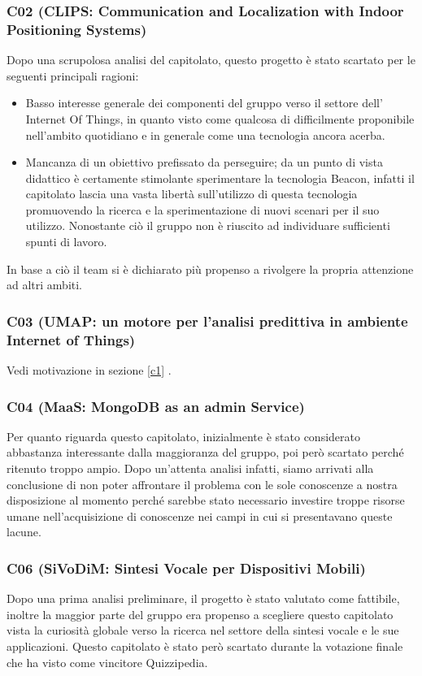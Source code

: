 \documentclass[a4paper,11pt]{article}
\begin{document}
\subsubsection{C02 (CLIPS: Communication and Localization with Indoor Positioning Systems)}
Dopo una scrupolosa analisi del capitolato, questo progetto è stato scartato per le seguenti principali ragioni: 
\begin{itemize}
\item Basso interesse generale dei componenti del gruppo verso il settore dell' Internet Of Things, in quanto visto come qualcosa di difficilmente proponibile nell'ambito quotidiano  e in generale come una tecnologia ancora acerba.
\item Mancanza di un obiettivo prefissato da perseguire; da un punto di vista didattico è certamente stimolante sperimentare la tecnologia Beacon, infatti il capitolato lascia una vasta libertà sull'utilizzo di questa tecnologia promuovendo la ricerca e la sperimentazione di nuovi scenari per il suo utilizzo. Nonostante ciò il gruppo non è riuscito ad individuare sufficienti spunti di lavoro.
\end{itemize}
In base a ciò il team si è dichiarato più propenso a rivolgere la propria attenzione ad altri ambiti.

\subsubsection{C03 (UMAP: un motore per l'analisi predittiva in ambiente Internet of Things)}
Vedi motivazione in sezione \ref{c1} .

\subsubsection{C04 (MaaS: MongoDB as an admin Service)}
Per quanto riguarda questo capitolato, inizialmente è stato considerato abbastanza interessante dalla maggioranza del gruppo, poi però scartato perché ritenuto troppo ampio. Dopo un'attenta analisi infatti, siamo arrivati alla conclusione di non poter affrontare il problema con le sole conoscenze a nostra disposizione al momento perché sarebbe stato necessario investire troppe risorse umane nell'acquisizione di conoscenze nei campi in cui si presentavano queste lacune.

\subsubsection{C06 (SiVoDiM: Sintesi Vocale per Dispositivi Mobili)}
Dopo una prima analisi preliminare, il progetto è stato valutato come fattibile, inoltre la maggior parte del gruppo era propenso a scegliere questo capitolato vista la curiosità globale verso la ricerca nel settore della sintesi vocale e le sue applicazioni. Questo capitolato è stato però scartato durante la votazione finale che ha visto come vincitore Quizzipedia.
\end{document}
